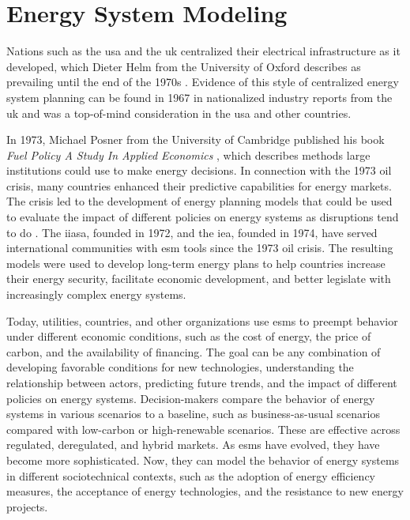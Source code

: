 \section{Energy System Modeling}
\label{sec:esm}

Nations such as the \gls{usa} and the \gls{uk} centralized their electrical
infrastructure as it developed, which Dieter Helm from the University of Oxford
describes as prevailing until the end of the 1970s \cite{helm_energy_2002}.
Evidence of this style of centralized energy system planning can be found in
1967 in nationalized industry reports from the \gls{uk}
\cite{treasury_nationalised_1967} and was a top-of-mind consideration in the
\gls{usa} and other countries.

In 1973, Michael Posner from the University of Cambridge published his book
\textit{Fuel Policy A Study In Applied Economics} \cite{posner_fuel_1973},
which describes methods large institutions could use to make energy decisions. In connection with the 1973 oil crisis, many countries enhanced their predictive capabilities for energy markets. The crisis led to the development of energy planning models that could be used to evaluate the impact of different policies on energy systems as disruptions tend to do \cite{plazas_disrupt_2022}. The \gls{iiasa}, founded in 1972, and the \gls{iea}, founded in 1974, have served international communities with \gls{esm} tools since the 1973 oil crisis. The resulting models were used to develop long-term energy plans to help countries increase their energy security, facilitate economic development, and better legislate with increasingly complex energy systems.

Today, utilities, countries, and other organizations use \glspl{esm} to preempt
behavior under different economic conditions, such as the cost of energy, the
price of carbon, and the availability of financing. The goal  can be any
combination of developing favorable conditions for new technologies,
understanding the relationship between actors, predicting future trends, and
the impact of different policies on energy systems. Decision-makers compare the
behavior of energy systems in various scenarios to a baseline, such as
business-as-usual scenarios compared with low-carbon or high-renewable
scenarios. These are effective across regulated, deregulated, and hybrid
markets. As \glspl{esm} have evolved, they have become more sophisticated. Now,
they can model the behavior of energy systems in different sociotechnical contexts, such as the adoption of energy efficiency measures, the acceptance of energy technologies, and the resistance to new energy projects.

